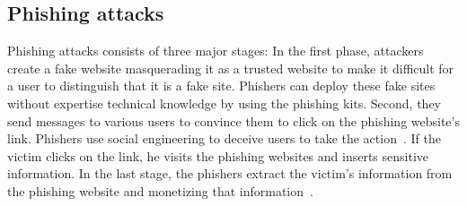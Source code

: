 \subsection{Phishing attacks}




Phishing attacks consists of three major stages: In the first phase, attackers create a fake website masquerading it as a trusted website to make it difficult for a user to distinguish that it is a fake site. Phishers can deploy these fake sites without expertise technical knowledge by using the phishing kits. Second, they send messages to various users to convince them to click on the phishing website's link. Phishers use social engineering to deceive users to take the action~\cite{dhamija2006phishing,thomas2013trafficking}. If the victim clicks on the link, he visits the phishing websites and inserts sensitive information. In the last stage, the phishers extract the victim's information from the phishing website and monetizing that information~\cite{gupta2018defending}.




